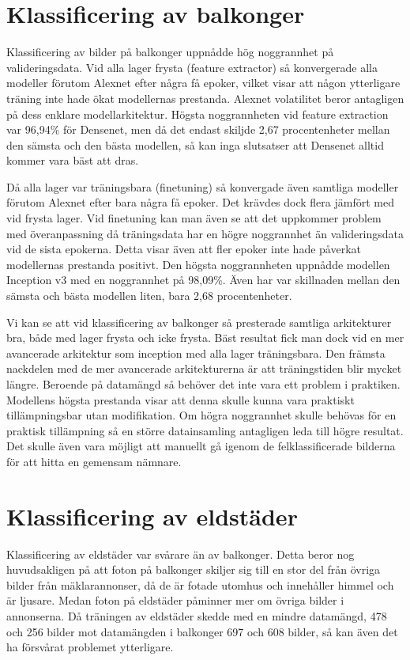 \documentclass[]{kththesis}
\begin{document}
\section{Klassificering av balkonger}
Klassificering av bilder på balkonger uppnådde hög noggrannhet på valideringsdata. Vid alla lager frysta (feature extractor) så konvergerade alla modeller förutom Alexnet efter några få epoker, vilket visar att någon ytterligare träning inte hade ökat modellernas prestanda. Alexnet volatilitet beror antagligen på dess enklare modellarkitektur. Högsta noggrannheten vid feature extraction var 96,94\% för Densenet, men då det endast skiljde 2,67 procentenheter mellan den sämsta och den bästa modellen, så kan inga slutsatser att Densenet alltid kommer vara bäst att dras.

Då alla lager var träningsbara (finetuning) så konvergade även samtliga modeller förutom Alexnet efter bara några få epoker. Det krävdes dock flera jämfört med vid frysta lager. Vid finetuning kan man även se att det uppkommer problem med överanpassning då träningsdata har en högre noggrannhet än valideringsdata vid de sista epokerna. Detta visar även att fler epoker inte hade påverkat modellernas prestanda positivt. Den högsta noggrannheten uppnådde modellen Inception v3 med en noggrannhet på 98,09\%. Även har var skillnaden mellan den sämsta och bästa modellen liten, bara 2,68 procentenheter.

Vi kan se att vid klassificering av balkonger så presterade samtliga arkitekturer bra, både med lager frysta och icke frysta. Bäst resultat fick man dock vid en mer avancerade arkitektur som inception med alla lager träningsbara. Den främsta nackdelen med de mer avancerade arkitekturerna är att träningstiden blir mycket längre. Beroende på datamängd så behöver det inte vara ett problem i praktiken. Modellens högsta prestanda visar att denna skulle kunna vara praktiskt tillämpningsbar utan modifikation. Om högra noggrannhet skulle behövas för en praktisk tillämpning så en större datainsamling antagligen leda till högre resultat. Det skulle även vara möjligt att manuellt gå igenom de felklassificerade bilderna för att hitta en gemensam nämnare.

\section{Klassificering av eldstäder}
Klassificering av eldstäder var svårare än av balkonger. Detta beror nog huvudsakligen på att foton på balkonger skiljer sig till en stor del från övriga bilder från mäklarannonser, då de är fotade utomhus och innehåller himmel och är ljusare. Medan foton på eldstäder påminner mer om övriga bilder i annonserna. Då träningen av eldstäder skedde med en mindre datamängd, 478 och 256 bilder mot datamängden i balkonger 697 och 608 bilder, så kan även det ha försvårat problemet ytterligare. 
\end{document}
